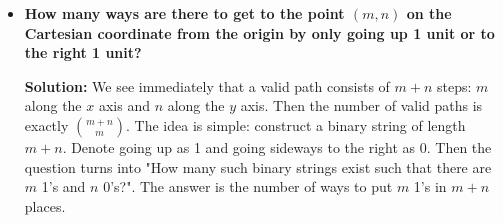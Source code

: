 \documentclass[12pt]{article}
\begin{document}
\begin{itemize}
    \item \textbf{How many ways are there to get to the point $(m,n)$ on the Cartesian coordinate from the origin by only going up 1 unit or to the right 1 unit?}
    \par \textbf{Solution:} We see immediately that a valid path consists of $m+n$ steps: $m$ along the $x$ axis and $n$ along the $y$ axis. Then the number of valid paths is exactly $\binom{m+n}{m}$. The idea is simple: construct a binary string of length $m+n$. Denote going up as 1 and going sideways to the right as 0. Then the question turns into "How many such binary strings exist such that there are $m$ 1's and $n$ 0's?". The answer is the number of ways to put $m$ 1's in $m+n$ places.
\end{itemize}
\end{document}
